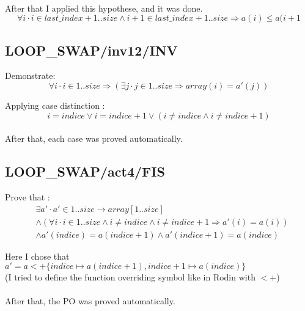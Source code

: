 \paragraph{}
After that I applied this hypothese, and it was done.
$$
\forall i \cdot i \in last\_index+1..size \land i+1 \in last\_index+1..size \Rightarrow a(i) \leq a(i+1
$$

\subsection{LOOP\_SWAP/inv12/INV}
Demonstrate:
$$
\forall i \cdot i \in 1..size \Rightarrow (\exists j \cdot j \in 1..size \Rightarrow array(i)=a'(j))
$$

Applying case distinction : 
$$
i=indice \lor i=indice+1 \lor (i \neq indice \land i \neq indice+1)
$$
\paragraph{}
After that, each case was proved automatically.

\subsection{LOOP\_SWAP/act4/FIS}
Prove that :
\begin{align*}
&\exists a' \cdot a' \in 1..size \to array[1..size] \\ 
&\land (\forall i \cdot i \in 1..size \land i \neq indice \land i \neq indice+1 \Rightarrow a'(i)=a(i)) \\ 
&\land a'(indice) = a(indice+1) \land a'(indice+1) = a(indice)
\end{align*}

Here I chose that $ a' =  a <+ \{indice \mapsto a(indice+1), indice+1 \mapsto a(indice) \} $ \\
(I tried to define the function overriding symbol like in Rodin with $<+$) 

\paragraph{}
After that, the PO was proved automatically.






